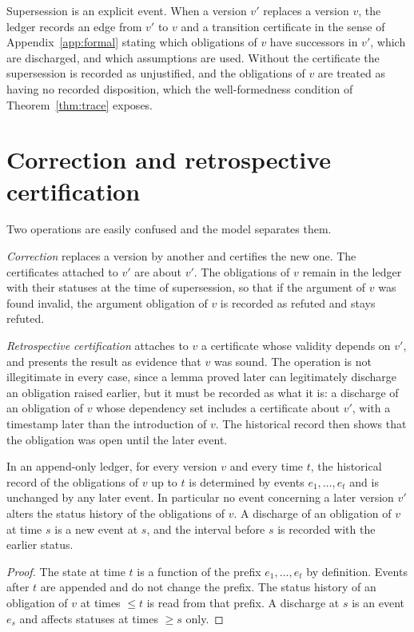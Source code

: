 Supersession is an explicit event. When a version $v'$ replaces a version $v$, the ledger records an edge from $v'$ to $v$ and a transition certificate in the sense of Appendix~\ref{app:formal} stating which obligations of $v$ have successors in $v'$, which are discharged, and which assumptions are used. Without the certificate the supersession is recorded as unjustified, and the obligations of $v$ are treated as having no recorded disposition, which the well-formedness condition of Theorem~\ref{thm:trace} exposes.

\section{Correction and retrospective certification}

Two operations are easily confused and the model separates them.

\emph{Correction} replaces a version by another and certifies the new one. The certificates attached to $v'$ are about $v'$. The obligations of $v$ remain in the ledger with their statuses at the time of supersession, so that if the argument of $v$ was found invalid, the argument obligation of $v$ is recorded as refuted and stays refuted.

\emph{Retrospective certification} attaches to $v$ a certificate whose validity depends on $v'$, and presents the result as evidence that $v$ was sound. The operation is not illegitimate in every case, since a lemma proved later can legitimately discharge an obligation raised earlier, but it must be recorded as what it is: a discharge of an obligation of $v$ whose dependency set includes a certificate about $v'$, with a timestamp later than the introduction of $v$. The historical record then shows that the obligation was open until the later event.

\begin{proposition}
\label{prop:rv012}
In an append-only ledger, for every version $v$ and every time $t$, the historical record of the obligations of $v$ up to $t$ is determined by events $e_1, \dots, e_t$ and is unchanged by any later event. In particular no event concerning a later version $v'$ alters the status history of the obligations of $v$. A discharge of an obligation of $v$ at time $s$ is a new event at $s$, and the interval before $s$ is recorded with the earlier status.
\end{proposition}

\begin{proof}
The state at time $t$ is a function of the prefix $e_1, \dots, e_t$ by definition. Events after $t$ are appended and do not change the prefix. The status history of an obligation of $v$ at times $\le t$ is read from that prefix. A discharge at $s$ is an event $e_s$ and affects statuses at times $\ge s$ only.
\end{proof}

